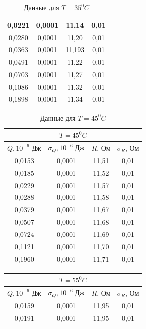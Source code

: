 \documentclass[a4paper, 12pt]{article}%
\begin{document}
\begin{enumerate}
\begin{table}[h]
\begin{center}
\begin{tabular}{|c|c|c|c|}
0,0221 & 0,0001 & 11,14 & 0,01 \\ \hline
0,0280 & 0,0001 & 11,20 & 0,01 \\ \hline
0,0363 & 0,0001 & 11,193 & 0,01 \\ \hline
0,0491 & 0,0001 & 11,22 & 0,01 \\ \hline
0,0703 & 0,0001 & 11,27 & 0,01 \\ \hline
0,1086 & 0,0001 & 11,32 & 0,01 \\ \hline
0,1898 & 0,0001 & 11,34 & 0,01 \\ \hline
\end{tabular}
\end{center}
\caption{Данные для $T = 35 ^0 C$}
\end{table}
\FloatBarrier
\begin{table}[h]
\begin{center}
\begin{tabular}{|c|c|c|c|}
\hline
\multicolumn{4}{|c|}{$T = 45 ^0 C$} \\ \hline
$Q, 10^{-6}$ Дж & $\sigma_Q, 10^{-6}$ Дж & $R$, Ом & $\sigma_R$, Ом \\ \hline
0,0153 & 0,0001 & 11,51 & 0,01 \\ \hline
0,0185 & 0,0001 & 11,52 & 0,01 \\ \hline
0,0229 & 0,0001 & 11,57 & 0,01 \\ \hline
0,0288 & 0,0001 & 11,58 & 0,01 \\ \hline
0,0379 & 0,0001 & 11,67 & 0,01 \\ \hline
0,0507 & 0,0001 & 11,68 & 0,01 \\ \hline
0,0724 & 0,0001 & 11,69 & 0,01 \\ \hline
0,1121 & 0,0001 & 11,70 & 0,01 \\ \hline
0,1960 & 0,0001 & 11,71 & 0,01 \\ \hline
\end{tabular}
\end{center}
\caption{Данные для $T = 45 ^0 C$}
\end{table}
\FloatBarrier
\FloatBarrier
\begin{table}[h]
\begin{center}
\begin{tabular}{|c|c|c|c|}
\hline
\multicolumn{4}{|c|}{$T = 55 ^0 C$} \\ \hline
$Q, 10^{-6}$ Дж & $\sigma_Q, 10^{-6}$ Дж & $R$, Ом & $\sigma_R$, Ом \\ \hline
0,0159 & 0,0001 & 11,95 & 0,01 \\ \hline
0,0191 & 0,0001 & 11,95 & 0,01 \\ \hline

\end{tabular}
\end{center}
\end{table}
\end{enumerate}
\end{document}
